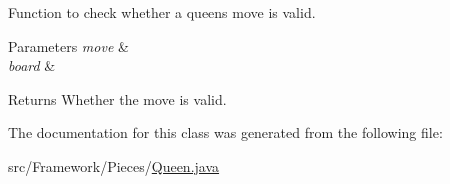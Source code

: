 Function to check whether a queen\textquotesingle{}s move is valid. 
\begin{DoxyParams}{Parameters}
{\em move} & \\
\hline
{\em board} & \\
\hline
\end{DoxyParams}
\begin{DoxyReturn}{Returns}
Whether the move is valid. 
\end{DoxyReturn}


The documentation for this class was generated from the following file\+:\begin{DoxyCompactItemize}
\item 
src/\+Framework/\+Pieces/\hyperlink{_queen_8java}{Queen.\+java}\end{DoxyCompactItemize}
